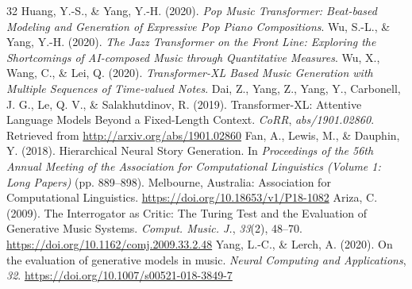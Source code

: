 \documentclass[sigconf]{nimeart}
\begin{document}
\begin{thebibliography}{32}
 {{ }}  Huang, Y.-S., \& Yang, Y.-H. (2020). \emph{Pop Music Transformer: Beat-based Modeling and Generation of Expressive Pop Piano Compositions}.{}
 {{ }}  Wu, S.-L., \& Yang, Y.-H. (2020). \emph{The Jazz Transformer on the Front Line: Exploring the Shortcomings of AI-composed Music through Quantitative Measures}.{}
 {{ }}  Wu, X., Wang, C., \& Lei, Q. (2020). \emph{Transformer-XL Based Music Generation with Multiple Sequences of Time-valued Notes}.{}
 {{ }}  Dai, Z., Yang, Z., Yang, Y., Carbonell, J. G., Le, Q. V., \& Salakhutdinov, R. (2019). Transformer-XL: Attentive Language Models Beyond a Fixed-Length Context. \emph{CoRR}, \emph{abs/1901.02860}. Retrieved from \url{http://arxiv.org/abs/1901.02860}{}
 {{ }}  Fan, A., Lewis, M., \& Dauphin, Y. (2018). Hierarchical Neural Story Generation. In \emph{Proceedings of the 56th Annual Meeting of the Association for Computational Linguistics (Volume 1: Long Papers)} (pp. 889--898). Melbourne, Australia: Association for Computational Linguistics. \url{https://doi.org/10.18653/v1/P18-1082}{}
 {{ }}  Ariza, C. (2009). The Interrogator as Critic: The Turing Test and the Evaluation of Generative Music Systems. \emph{Comput. Music. J.}, \emph{33}(2), 48--70. \url{https://doi.org/10.1162/comj.2009.33.2.48}{}
 {{ }}  Yang, L.-C., \& Lerch, A. (2020). On the evaluation of generative models in music. \emph{Neural Computing and Applications}, \emph{32}. \url{https://doi.org/10.1007/s00521-018-3849-7}{}
\end{thebibliography}
\end{document}

